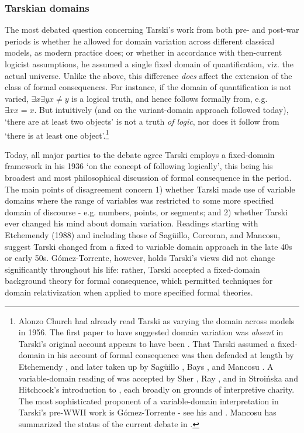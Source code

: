 \documentclass[]{article}
\begin{document}
\subsubsection{Tarskian domains}
The most debated question concerning Tarski's work from both pre- and post-war periods is whether he allowed for domain variation across different classical models, as modern practice does; or whether in accordance with then-current logicist assumptions, he assumed a single fixed domain of quantification, viz. the actual universe. Unlike the above, this difference \textit{does} affect the extension of the class of formal consequences. For instance, if the domain of quantification is not varied, $\exists x \exists y x \ne y$ is a logical truth, and hence follows formally from, e.g. $\exists x x = x$. But intuitively (and on the variant-domain approach followed today), `there are at least two objects' is not a truth \textit{of logic}, nor does it follow from `there is at least one object'.\footnote{Alonzo Church had already read Tarski as varying the domain across models in 1956. The first paper to have suggested domain variation was \textit{absent} in Tarski's original account appears to have been \autocite[43]{Corcoran1972}. That Tarski assumed a fixed-domain in his account of formal consequence was then defended at length by Etchemendy \autocite{Etchemendy1988} \autocite{Etchemendy1990} \autocite{Etchemendy2008}, and later taken up by Sag\"{u}illo \autocite{Saguillo1997} \autocite{Saguillo2009} \autocite{Corcoran2011}, Bays \autocite{Bays2001}, and Mancosu \autocite{Mancosu2006} \autocite{Mancosu2010a}. A variable-domain reading of \autocite{Tarski2002} was accepted by Sher \autocite{Sher1991} \autocite{Sher1996}, Ray \autocite{Ray1996}, and in Stroi\'{n}ska and Hitchcock's introduction to \autocite{Tarski2002}, each broadly on grounds of interpretive charity. The most sophisticated proponent of a variable-domain interpretation in Tarski's pre-WWII work is G\'{o}mez-Torrente - see his \autocite{Gomez-Torrente1996}  and \autocite{Gomez-Torrente2009}. Mancosu has summarized the status of the current debate in \autocite{Mancosu2010b}.}

Today, all major parties to the debate agree Tarski employs a fixed-domain framework in his 1936 `on the concept of following logically', this being his broadest and most philosophical discussion of formal consequence in the period. The main points of disagreement concern 1) whether Tarski made use of variable domains where the range of variables was restricted to some more specified domain of discourse - e.g. numbers, points, or segments; and 2) whether Tarski ever changed his mind about domain variation. Readings starting with Etchemendy (1988) and including those of Sag\"{u}illo, Corcoran, and Mancosu, suggest Tarski changed from a fixed to variable domain approach in the late 40s or early 50s. G\'{o}mez-Torrente, however, holds Tarski's views did not change significantly throughout his life: rather, Tarski accepted a fixed-domain background theory for formal consequence, which permitted techniques for domain relativization when applied to more specified formal theories.
\end{document}
